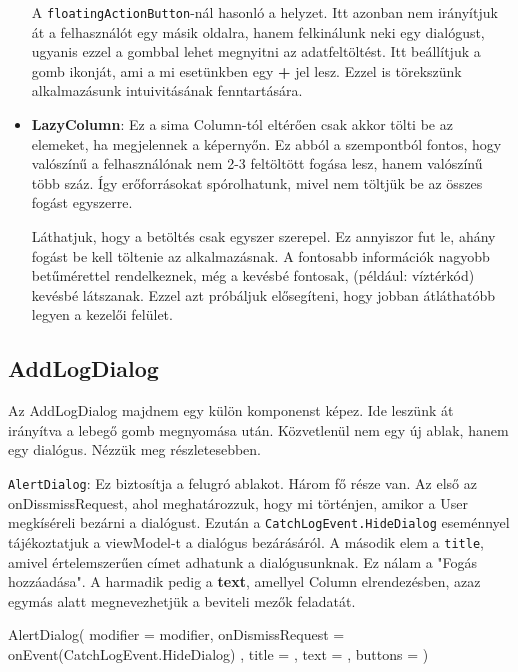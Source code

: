 \begin{itemize}
A \texttt{floatingActionButton}-nál hasonló a helyzet. Itt azonban nem irányítjuk át a felhasználót egy másik oldalra, hanem felkinálunk neki egy dialógust, ugyanis ezzel a gombbal lehet megnyitni az adatfeltöltést. Itt beállítjuk a gomb ikonját, ami a mi esetünkben egy \textbf{+} jel lesz. Ezzel is törekszünk alkalmazásunk intuivitásának fenntartására.

\item \textbf{LazyColumn}: Ez a sima Column-tól eltérően csak akkor tölti be az elemeket, ha megjelennek a képernyőn. Ez abból a szempontból fontos, hogy valószínű a felhasználónak nem 2-3 feltöltött fogása lesz, hanem valószínű több száz. Így erőforrásokat spórolhatunk, mivel nem töltjük be az összes fogást egyszerre.

Láthatjuk, hogy a betöltés csak egyszer szerepel. Ez annyiszor fut le, ahány fogást be kell töltenie az alkalmazásnak. A fontosabb információk nagyobb betűmérettel rendelkeznek, még a kevésbé fontosak, (például: víztérkód) kevésbé látszanak. Ezzel azt próbáljuk elősegíteni, hogy jobban átláthatóbb legyen a kezelői felület.
\end{itemize}

\newpage

\subsection{AddLogDialog}

Az AddLogDialog majdnem egy külön komponenst képez. Ide leszünk át irányítva a lebegő gomb megnyomása után. Közvetlenül nem egy új ablak, hanem egy dialógus. Nézzük meg részletesebben.

 \texttt{AlertDialog}: Ez biztosítja a felugró ablakot. Három fő része van. Az első az onDissmissRequest, ahol meghatározzuk, hogy mi történjen, amikor a User megkíséreli bezárni a dialógust. Ezután a \texttt{CatchLogEvent.HideDialog} eseménnyel tájékoztatjuk a viewModel-t a dialógus bezárásáról. A második elem a \texttt{title}, amivel értelemszerűen címet adhatunk a dialógusunknak. Ez nálam a "Fogás hozzáadása". A harmadik pedig a \textbf{text}, amellyel Column elrendezésben, azaz egymás alatt megnevezhetjük a beviteli mezők feladatát.

\begin{java}[caption = {Az AlertDialog felépítési váza.}]
AlertDialog(
    modifier = modifier,
    onDismissRequest = {
        onEvent(CatchLogEvent.HideDialog)
    },
    title = { },
    text = { },
    buttons = { }
)
\end{java}


